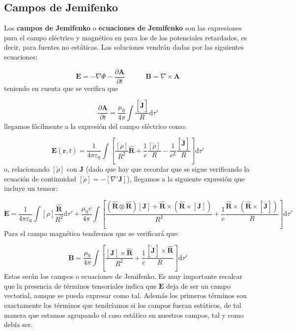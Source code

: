 \documentclass[12pt,a4paper]{article}
\newcommand{\parciales}[2]{\frac{\partial #1}{\partial #2}}
\newcommand{\ccorchetes}[1]{\left[ #1  \right]}
\newcommand{\D}{\mathrm{d}}
\newcommand{\tquad}{\quad \quad \quad}
\newcommand{\rota}{\nabla \times}
\newcommand{\Bn}{\mathbf{B}}
\newcommand{\En}{\mathbf{E}}
\newcommand{\Jn}{\mathbf{J}}
\newcommand{\rn}{\mathbf{r}}
\newcommand{\An}{\mathbf{A}}
\newcommand{\hnR}{\hat{\mathbf{R}}}
\numberwithin{equation}{section}
\numberwithin{figure}{section}
\begin{document}
\subsection{Campos de Jemifenko}
Los \textbf{campos de Jemifenko} o \textbf{ecuaciones de Jemifenko} son las expresiones para el campo eléctrico y magnético en para los de los potenciales retardados, es decir, para fuentes no estáticas. Las soluciones vendrán dadas por las siguientes ecuaciones:

\begin{equation}
\En = - \nabla \Phi - \parciales{\An}{t} \tquad \Bn = \rota \An \label{Ec:07.3.0.10}
\end{equation}
teniendo en cuenta que se verifica que

\begin{equation}
\parciales{\An}{t} = \dfrac{\mu_0}{4 \pi} \int \dfrac{[\dot{\Jn}]}{R} \D \tau '
\end{equation}
llegamos fácilmente a la expresión del campo eléctrico como:

\begin{equation}
\En ( \rn,t) = \dfrac{1}{4 \pi \varepsilon_0} \int \ccorchetes{ \dfrac{[\rho]}{R^2} \hnR+ \dfrac{1}{c}\dfrac{[\dot{\rho}]}{R} - \dfrac{1}{c^2} \dfrac{[\dot{\Jn}]}{ R} }\D \tau'
\end{equation}
o, relacionando $[\dot{\rho}]$ con $\Jn$ (dado que hay que recordar que se sigue verificando la ecuación de continuidad $[\dot{\rho}]=-[\nabla' \Jn]$), llegamos a la siguiente expresión que incluye un tensor:

\begin{equation}
\En = \dfrac{1}{4 \pi \varepsilon_0} \int [\rho] \dfrac{\hnR}{R^2} \D \tau' + \dfrac{\mu_0 c}{4 \pi} \int \ccorchetes{\dfrac{(\hnR \otimes \hnR)[\Jn]+ \hnR \times (\hnR \times [\Jn])}{R^2}  + \dfrac{1}{c} \dfrac{\hnR \times (\hnR \times [\dot{\Jn}])}{R} } \D \tau'
\end{equation}
Para el campo magnético tendremos que se verificará que:

\begin{equation}
\Bn = \dfrac{\mu_0}{4 \pi} \int \ccorchetes{\dfrac{[\Jn] \times  \hnR}{R^2} + \dfrac{1}{c} \dfrac{[\dot{\Jn}] \times \hnR}{R}} \D \tau'
\end{equation}
Estas serán los campos o ecuaciones de Jemifenko. Es muy importante recalcar que 
la presencia de términos tensoriales indica que $\En$ deja de ser un campo vectorial, aunque se pueda expresar como tal. Además los primeros términos son exactamente los términos que tendríamos si los campos fueran estáticos, de tal manera que estamos agrupando el caso estático en nuestros campos, tal y como debía ser. 
\end{document}
